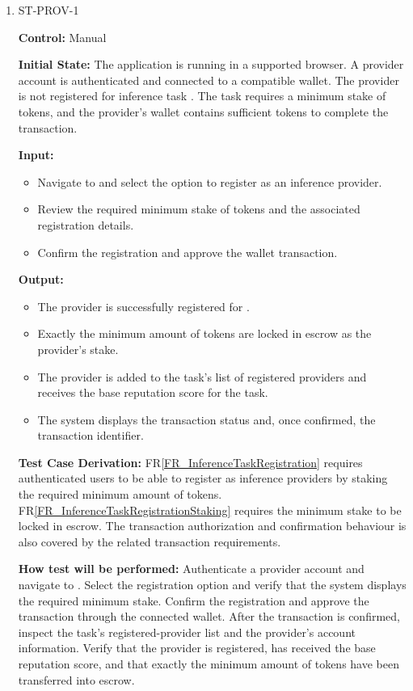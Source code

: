 \documentclass[12pt]{article}
\newcommand{\rref}[1]{FR\ref{#1}}
\newcommand{\fixture}[1]{\texttt{\seqsplit{#1}}}
\begin{document}
\begin{enumerate}

\item{ST-PROV-1\\}

\textbf{Control:} Manual

\textbf{Initial State:} The application is running in a supported browser. A provider
account is authenticated and connected to a compatible wallet. The provider
is not registered for inference task \fixture{TASK-01}. The task requires a
minimum stake of tokens, and the provider's wallet contains sufficient
tokens to complete the transaction.

\textbf{Input:}
\begin{itemize}
\item[1.] Navigate to \fixture{TASK-01} and select the option to register as an
inference provider.
\item[2.] Review the required minimum stake of tokens and the associated
registration details.
\item[3.] Confirm the registration and approve the wallet transaction.
\end{itemize}

\textbf{Output:}
\begin{itemize}
\item[1.] The provider is successfully registered for \fixture{TASK-01}.
\item[2.] Exactly the minimum amount of tokens are locked in escrow as the provider's stake.
\item[3.] The provider is added to the task's list of registered providers and
receives the base reputation score for the task.
\item[4.] The system displays the transaction status and, once confirmed, the
transaction identifier.
\end{itemize}

\textbf{Test Case Derivation:} \rref{FR_InferenceTaskRegistration} requires authenticated
users to be able to register as inference providers by staking the required
minimum amount of tokens. \rref{FR_InferenceTaskRegistrationStaking} requires the
minimum stake to be locked in escrow. The transaction authorization and
confirmation behaviour is also covered by the related transaction
requirements.

\textbf{How test will be performed:} Authenticate a provider account and navigate to
\fixture{TASK-01}. Select the registration option and verify that the system
displays the required minimum stake. Confirm the registration and approve
the transaction through the connected wallet. After the transaction is
confirmed, inspect the task's registered-provider list and the provider's
account information. Verify that the provider is registered, has received
the base reputation score, and that exactly the minimum amount of tokens have been transferred
into escrow.


\end{enumerate}
\end{document}
